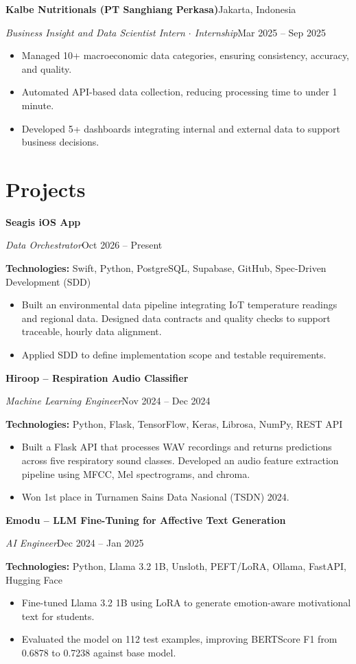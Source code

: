 \documentclass[10pt,a4paper]{article}
\newcommand{\entry}[4]{%
  \textbf{#1}\hfill #2\par
  \textit{#3}\hfill #4\par
}
\newcommand{\project}[4]{%
  \textbf{#1}\par
  \textit{#2}\hfill #3\par
  \textbf{Technologies:} #4\par
}
\newcommand{\entrygap}{\vspace{4pt}}
\begin{document}
\entry{Kalbe Nutritionals (PT Sanghiang Perkasa)}{Jakarta, Indonesia}
      {Business Insight and Data Scientist Intern $\cdot$ Internship}{Mar 2025 -- Sep 2025}
\begin{itemize}
  \item Managed 10+ macroeconomic data categories, ensuring consistency, accuracy, and quality.
  \item Automated API-based data collection, reducing processing time to under 1 minute.
  \item Developed 5+ dashboards integrating internal and external data to support business decisions.
\end{itemize}

\section{Projects}

\project{Seagis iOS App}{Data Orchestrator}{Oct 2026 -- Present}
        {Swift, Python, PostgreSQL, Supabase, GitHub, Spec-Driven Development (SDD)}
\begin{itemize}
  \item Built an environmental data pipeline integrating IoT temperature readings and regional data. Designed data contracts and quality checks to support traceable, hourly data alignment.
  \item Applied SDD to define implementation scope and testable requirements.
\end{itemize}
\entrygap

\project{Hiroop -- Respiration Audio Classifier}{Machine Learning Engineer}{Nov 2024 -- Dec 2024}
        {Python, Flask, TensorFlow, Keras, Librosa, NumPy, REST API}
\begin{itemize}
  \item Built a Flask API that processes WAV recordings and returns predictions across five respiratory sound classes. Developed an audio feature extraction pipeline using MFCC, Mel spectrograms, and chroma.
  \item Won 1st place in Turnamen Sains Data Nasional (TSDN) 2024.
\end{itemize}
\entrygap

\project{Emodu -- LLM Fine-Tuning for Affective Text Generation}{AI Engineer}{Dec 2024 -- Jan 2025}
        {Python, Llama 3.2 1B, Unsloth, PEFT/LoRA, Ollama, FastAPI, Hugging Face}
\begin{itemize}
  \item Fine-tuned Llama 3.2 1B using LoRA to generate emotion-aware motivational text for students.
  \item Evaluated the model on 112 test examples, improving BERTScore F1 from 0.6878 to 0.7238 against base model.
\end{itemize}
\end{document}
